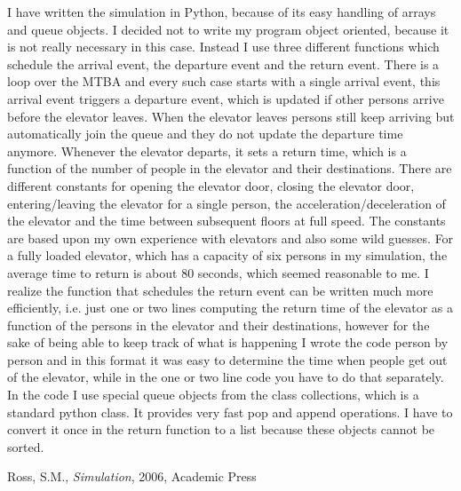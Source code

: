 \documentclass[10pt,a4paper]{article}
\begin{document}
I have written the simulation in Python, because of its easy handling of arrays and queue objects. I decided not to write my program object oriented, because it is not really necessary in this case. Instead I use three different functions which schedule the arrival event, the departure event and the return event. There is a loop over the MTBA and every such case starts with a single arrival event, this arrival event triggers a departure event, which is updated if other persons arrive before the elevator leaves. When the elevator leaves persons still keep arriving but automatically join the queue and they do not update the departure time anymore. Whenever the elevator departs, it sets a return time, which is a function of the number of people in the elevator and their destinations. There are different constants for opening the elevator door, closing the elevator door, entering/leaving the elevator for a single person, the acceleration/deceleration of the elevator and the time between subsequent floors at full speed. The constants are based upon my own experience with elevators and also some wild guesses. For a fully loaded elevator, which has a capacity of six persons in my simulation, the average time to return is about 80 seconds, which seemed reasonable to me. I realize the function that schedules the return event can be written much more efficiently, i.e. just one or two lines computing the return time of the elevator as a function of the persons in the elevator and their destinations, however for the sake of being able to keep track of what is happening I wrote the code person by person and in this format it was easy to determine the time when people get out of the elevator, while in the one or two line code you have to do that separately.
In the code I use special queue objects from the class collections, which is a standard python class. It provides very fast pop and append operations. I have to convert it once in the return function to a list because these objects cannot be sorted. 

\begin{thebibliography}{15}
  Ross, S.M., \emph{Simulation}, 2006, Academic Press
\end{thebibliography}
\end{document}
